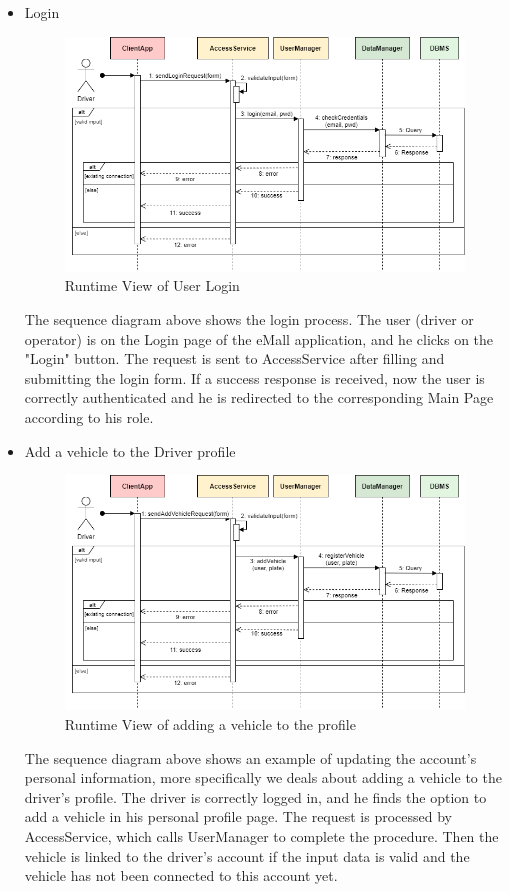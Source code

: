 \documentclass[../main.tex]{subfiles}
\begin{document}
\begin{itemize}
    \newpage
    \item Login
    {
    \vspace{2em}
    \begin{figure}[H]
    \centering
    \includegraphics[width=\textwidth]{runtimeview/rv_login.png}
    \caption{Runtime View of User Login}
    \label{fig:rv_login}
    \end{figure}}
    The sequence diagram above shows the login process. The user (driver or operator) is on the Login page of the eMall application, and he clicks on the "Login" button. The request is sent to AccessService after filling and submitting the login form. If a success response is received, now the user is correctly authenticated and he is redirected to the corresponding Main Page according to his role.

    \newpage
    \item Add a vehicle to the Driver profile
    {
    \vspace{2em}
    \begin{figure}[H]
    \centering
    \includegraphics[width=\textwidth]{runtimeview/rv_addVehicle.png}
    \caption{Runtime View of adding a vehicle to the profile}
    \label{fig:rv_addVehicle}
    \end{figure}}
    The sequence diagram above shows an example of updating the account's personal information, more specifically we deals about adding a vehicle to the driver's profile. The driver is correctly logged in, and he finds the option to add a vehicle in his personal profile page. The request is processed by AccessService, which calls UserManager to complete the procedure. Then the vehicle is linked to the driver's account if the input data is valid and the vehicle has not been connected to this account yet. 


\end{itemize}
\end{document}
